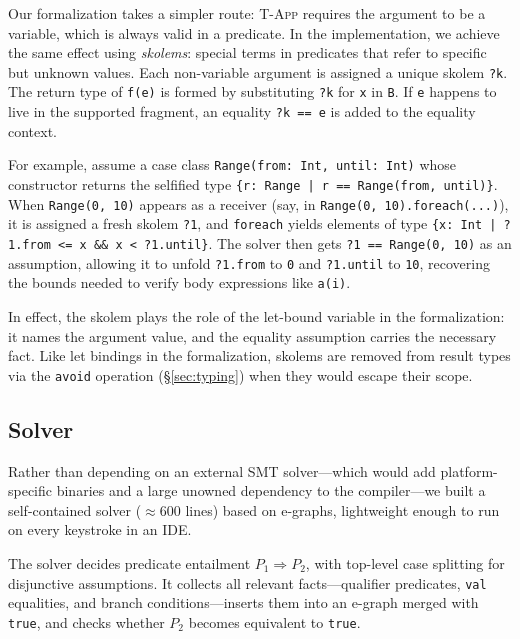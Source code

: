 \documentclass[acmsmall]{acmart}
\begin{document}
Our formalization takes a simpler route: \textsc{T-App} requires the argument to be a variable, which is always valid in a predicate. In the implementation, we achieve the same effect using \emph{skolems}: special terms in predicates that refer to specific but unknown values. Each non-variable argument is assigned a unique skolem \lstinline!?k!. The return type of \lstinline!f(e)! is formed by substituting \lstinline!?k! for \lstinline!x! in \lstinline!B!. If \lstinline!e! happens to live in the supported fragment, an equality \lstinline!?k == e! is added to the equality context.

For example, assume a case class \lstinline!Range(from: Int, until: Int)! whose constructor returns the selfified type \lstinline!{r: Range | r == Range(from, until)}!. When \lstinline!Range(0, 10)! appears as a receiver (say, in \lstinline!Range(0, 10).foreach(...)!), it is assigned a fresh skolem \lstinline!?1!, and \lstinline!foreach! yields elements of type \lstinline!{x: Int | ?1.from <= x && x < ?1.until}!. The solver then gets \lstinline!?1 == Range(0, 10)! as an assumption, allowing it to unfold \lstinline!?1.from! to \lstinline!0! and \lstinline!?1.until! to \lstinline!10!, recovering the bounds needed to verify body expressions like \lstinline!a(i)!.

In effect, the skolem plays the role of the let-bound variable in the formalization: it names the argument value, and the equality assumption carries the necessary fact. Like let bindings in the formalization, skolems are removed from result types via the \lstinline!avoid! operation (\S\ref{sec:typing}) when they would escape their scope.

\subsection{Solver}\label{sec:solver}

Rather than depending on an external SMT solver---which would add platform-specific binaries and a large unowned dependency to the compiler---we built a self-contained solver ($\approx$600 lines) based on e-graphs, lightweight enough to run on every keystroke in an IDE.

The solver decides predicate entailment $P_1 \Rightarrow P_2$, with top-level case splitting for disjunctive assumptions. It collects all relevant facts---qualifier predicates, \lstinline!val! equalities, and branch conditions---inserts them into an e-graph merged with \lstinline!true!, and checks whether $P_2$ becomes equivalent to \lstinline!true!.
\end{document}
